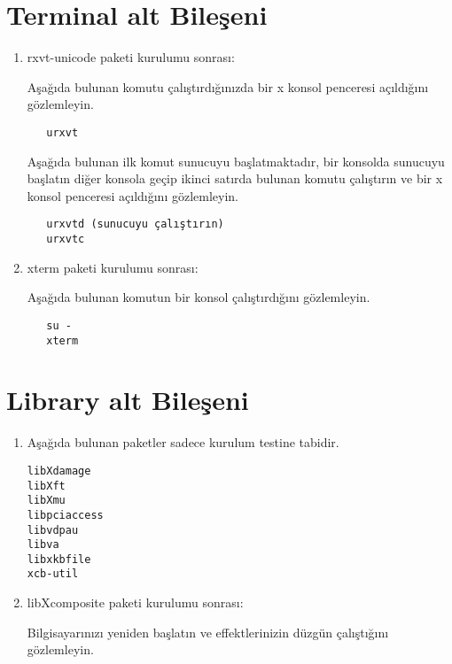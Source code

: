 \documentclass[a4paper,10pt]{article}
\begin{document}
\section{Terminal alt Bileşeni}
\begin{enumerate}
  \item rxvt-unicode paketi kurulumu sonrası:

  Aşağıda bulunan komutu çalıştırdığınızda bir x konsol penceresi açıldığını gözlemleyin.
  \begin{verbatim}
   urxvt
  \end{verbatim}

  Aşağıda bulunan ilk komut sunucuyu başlatmaktadır, bir konsolda sunucuyu başlatın diğer konsola geçip ikinci satırda bulunan komutu çalıştırın ve bir x konsol penceresi açıldığını gözlemleyin.
  \begin{verbatim}
   urxvtd (sunucuyu çalıştırın)
   urxvtc
  \end{verbatim}

  \item xterm paketi kurulumu sonrası:

  Aşağıda bulunan komutun bir konsol çalıştırdığını gözlemleyin.
  \begin{verbatim}
   su -
   xterm
  \end{verbatim}
\end{enumerate}
\section{Library alt Bileşeni}
\begin{enumerate}
 \item Aşağıda bulunan paketler sadece kurulum testine tabidir.
  \begin{verbatim}
libXdamage
libXft
libXmu
libpciaccess
libvdpau
libva
libxkbfile
xcb-util
  \end{verbatim}

\item libXcomposite paketi kurulumu sonrası:

Bilgisayarınızı yeniden başlatın ve effektlerinizin düzgün çalıştığını gözlemleyin.

\end{enumerate}
\end{document}
